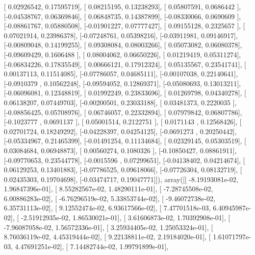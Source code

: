 \documentclass{article}
\begin{document}
       [ 0.02926542,  0.17595719],
       [ 0.08215195,  0.13238293],
       [ 0.05807591,  0.0686442 ],
       [-0.04538767,  0.06369846],
       [ 0.06848735,  0.14387899],
       [-0.08330066,  0.0690609 ],
       [-0.08861767,  0.05880508],
       [-0.01901227,  0.07777427],
       [ 0.09155128,  0.2325657 ],
       [ 0.07021914,  0.23986378],
       [-0.07248761,  0.05398216],
       [-0.03911981,  0.09146917],
       [-0.00809048,  0.14199255],
       [ 0.09308084,  0.08003266],
       [ 0.05073082,  0.06080378],
       [-0.09609429,  0.1606488 ],
       [ 0.08004062,  0.06650226],
       [ 0.01219419,  0.05311274],
       [-0.06834226,  0.17835549],
       [ 0.00666121,  0.17912324],
       [ 0.05135567,  0.23541741],
       [ 0.00137113,  0.11514085],
       [-0.07786057,  0.04685111],
       [-0.00107038,  0.22140641],
       [-0.0910379 ,  0.10562248],
       [-0.09594052,  0.12869371],
       [-0.05080693,  0.13013211],
       [-0.06096081,  0.12348819],
       [ 0.01992249,  0.23833696],
       [ 0.01269798,  0.04340278],
       [ 0.06138207,  0.07449703],
       [-0.00200501,  0.23033188],
       [ 0.03481373,  0.2220035 ],
       [-0.08856425,  0.05708976],
       [ 0.06746057,  0.22332894],
       [ 0.07979842,  0.06807786],
       [-0.1023777 ,  0.0691137 ],
       [ 0.05001514,  0.2122751 ],
       [ 0.0171143 ,  0.12568426],
       [ 0.02701724,  0.18249292],
       [-0.04228397,  0.04254125],
       [-0.0691273 ,  0.20250442],
       [-0.05334967,  0.21465399],
       [-0.01491254,  0.11134684],
       [ 0.02329145,  0.05303519],
       [ 0.03084684,  0.06948873],
       [ 0.00560274,  0.1080326 ],
       [-0.10850427,  0.08861911],
       [-0.09770653,  0.23544778],
       [-0.0015596 ,  0.07299651],
       [-0.04138402,  0.04214674],
       [ 0.06129253,  0.13401883],
       [-0.07786525,  0.09618066],
       [-0.07726304,  0.08132719],
       [ 0.02435303,  0.19704698],
       [-0.03474717,  0.19047771]]), array([[ -8.19193081e-02,   1.96847396e-01],
       [  8.55282567e-02,   1.48290111e-01],
       [ -7.28745508e-02,   6.00886283e-02],
       [ -6.76296519e-02,   5.33853744e-02],
       [ -9.46072738e-02,   6.35731113e-02],
       [  9.12552474e-02,   6.93617566e-02],
       [  7.47701518e-03,   6.40945987e-02],
       [ -2.51912935e-02,   1.86530021e-01],
       [  3.61606873e-02,   1.70392908e-01],
       [ -7.96087058e-02,   1.56572336e-01],
       [  3.25934405e-02,   1.25053324e-01],
       [  8.76036119e-02,   4.45319444e-02],
       [  9.22138811e-02,   2.19184020e-01],
       [  1.61071797e-03,   4.47691251e-02],
       [  7.14482744e-02,   1.99791899e-01],
\end{document}
